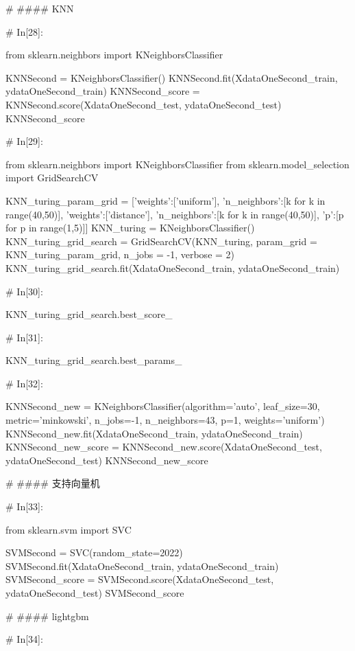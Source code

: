 \documentclass{MathorCupmodeling}
\begin{document}
\begin{python}
# #### KNN

# In[28]:


from sklearn.neighbors import KNeighborsClassifier

KNNSecond = KNeighborsClassifier()
KNNSecond.fit(XdataOneSecond_train, ydataOneSecond_train)
KNNSecond_score = KNNSecond.score(XdataOneSecond_test, ydataOneSecond_test)
KNNSecond_score


# In[29]:


from sklearn.neighbors import KNeighborsClassifier
from sklearn.model_selection import GridSearchCV

KNN_turing_param_grid = [{'weights':['uniform'],
                          'n_neighbors':[k for k in range(40,50)]},
                         {'weights':['distance'],
                          'n_neighbors':[k for k in range(40,50)],
                          'p':[p for p in range(1,5)]}]
KNN_turing = KNeighborsClassifier()
KNN_turing_grid_search = GridSearchCV(KNN_turing,
                                      param_grid = KNN_turing_param_grid,
                                      n_jobs = -1,
                                      verbose = 2)
KNN_turing_grid_search.fit(XdataOneSecond_train, ydataOneSecond_train)


# In[30]:


KNN_turing_grid_search.best_score_


# In[31]:


KNN_turing_grid_search.best_params_


# In[32]:


KNNSecond_new = KNeighborsClassifier(algorithm='auto', leaf_size=30,
                                     metric='minkowski',
                                     n_jobs=-1,
                                     n_neighbors=43, p=1,
                                     weights='uniform')
KNNSecond_new.fit(XdataOneSecond_train, ydataOneSecond_train)
KNNSecond_new_score = KNNSecond_new.score(XdataOneSecond_test, ydataOneSecond_test)
KNNSecond_new_score


# #### 支持向量机

# In[33]:


from sklearn.svm import SVC

SVMSecond = SVC(random_state=2022)
SVMSecond.fit(XdataOneSecond_train, ydataOneSecond_train)
SVMSecond_score = SVMSecond.score(XdataOneSecond_test, ydataOneSecond_test)
SVMSecond_score


# #### lightgbm

# In[34]:



\end{python}
\end{document}
